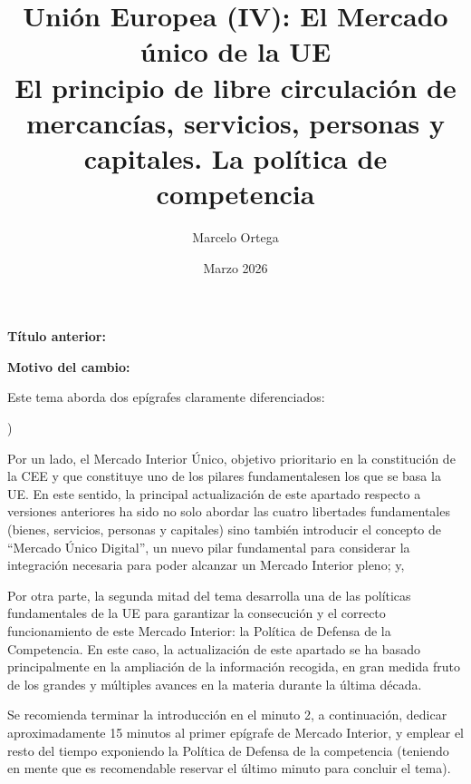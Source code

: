 \documentclass[10pt,a4paper]{article}
\title{Unión Europea (IV): El Mercado único de la UE\\
\large El principio de libre circulación de mercancías, servicios, personas y capitales. La política de competencia}
\author{Marcelo Ortega}
\date{Marzo 2026}
\newcounter{alphaitem}
\newcommand{\puntosclave}[1]{%
  \begin{tcolorbox}[
    colframe=black,
    title={Puntos clave},
    before upper={\setlength{\parindent}{0.5cm}\setlength{\parskip}{0.5\baselineskip}}
  ]
  #1
  \end{tcolorbox}
}
\newenvironment{la}
      {\begin{list}{\alph{alphaitem})}{%
          \usecounter{alphaitem}%
          \setlength{\leftmargin}{1cm}%
          \setlength{\parskip}{3pt}%
          \setlength{\itemsep}{0pt}%
          \setlength{\parsep}{0pt}%
      }}
      {\end{list}}
\newcommand{\changebox}{%
\begin{tcolorbox}[title={Historial de cambios del tema}]
\textbf{Título anterior:} \OldTitle\par
\textbf{Motivo del cambio:} \ChangeWhy
\end{tcolorbox}
}
\begin{document}
\maketitle
\changebox

\newpage

\puntosclave{ %
     Este tema aborda dos epígrafes claramente diferenciados:
     \begin{la}
         \item Por un lado, el Mercado Interior Único, objetivo prioritario en la constitución de la CEE y que constituye uno de los pilares fundamentalesen los que se basa la UE. En este sentido, la principal actualización de este apartado respecto a versiones anteriores ha sido no solo abordar las cuatro libertades fundamentales (bienes, servicios, personas y capitales) sino también introducir el concepto de “Mercado Único Digital”, un nuevo pilar fundamental para considerar la integración necesaria para poder alcanzar un Mercado Interior pleno; y,
         \item Por otra parte, la segunda mitad del tema desarrolla una de las políticas fundamentales de la UE para garantizar la consecución y el correcto funcionamiento de este Mercado Interior: la Política  de Defensa de la Competencia. En este caso, la actualización de este apartado se ha basado principalmente en la ampliación de la información recogida, en gran medida fruto de los grandes y múltiples avances en la materia durante la última década.
     \end{la}

     Se recomienda terminar la introducción en el minuto 2, a continuación, dedicar aproximadamente 15 minutos al primer epígrafe de Mercado Interior, y emplear el resto del tiempo exponiendo la Política de Defensa de la competencia (teniendo en mente que es recomendable reservar el último minuto para concluir el tema).
    }
\vspace{1cm}
\end{document}
